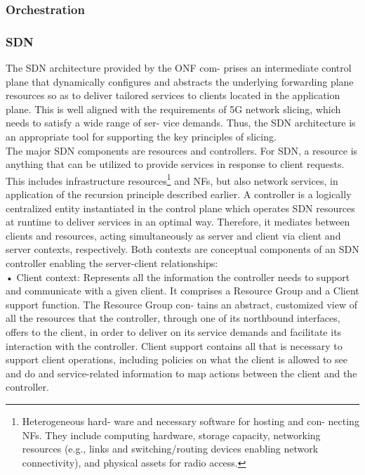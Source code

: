 \documentclass{article}
\begin{document}
\subsubsection{Orchestration}


\subsubsection{SDN}
The SDN architecture provided by the ONF com-
prises an intermediate control plane that dynamically configures and abstracts the underlying
forwarding plane resources so as to deliver tailored services to clients located in the application plane. This is
well aligned with the requirements of 5G network
slicing, which needs to satisfy a wide range of ser-
vice demands. Thus, the SDN architecture is an appropriate
tool for supporting the key principles of slicing.\\
The major SDN components are resources and controllers. For
SDN, a resource is anything that can be utilized to
provide services in response to client requests. This
includes infrastructure resources\footnote{Heterogeneous hard-
ware and necessary software for hosting and con-
necting NFs. They include computing hardware,
storage capacity, networking resources (e.g., links
and switching/routing devices enabling network
connectivity), and physical assets for radio access.
} and NFs, but also
network services, in application of the recursion
principle described earlier. A controller is a logically centralized entity instantiated in the control
plane which operates SDN resources at runtime
to deliver services in an optimal way. Therefore,
it mediates between clients and resources, acting simultaneously as server and client via client
and server contexts, respectively. Both contexts
are conceptual components of an SDN controller
enabling the server-client relationships:\\
• Client context: Represents all the information the
controller needs to support and communicate with
a given client. It comprises a Resource Group and
a Client support function. The Resource Group con-
tains an abstract, customized view of all the resources that the controller, through one of its northbound
interfaces, offers to the client, in order to deliver
on its service demands and facilitate its interaction
with the controller. Client support contains all that
is necessary to support client operations, including
policies on what the client is allowed to see and do and service-related information to map actions
between the client and the controller.\\
\end{document}
